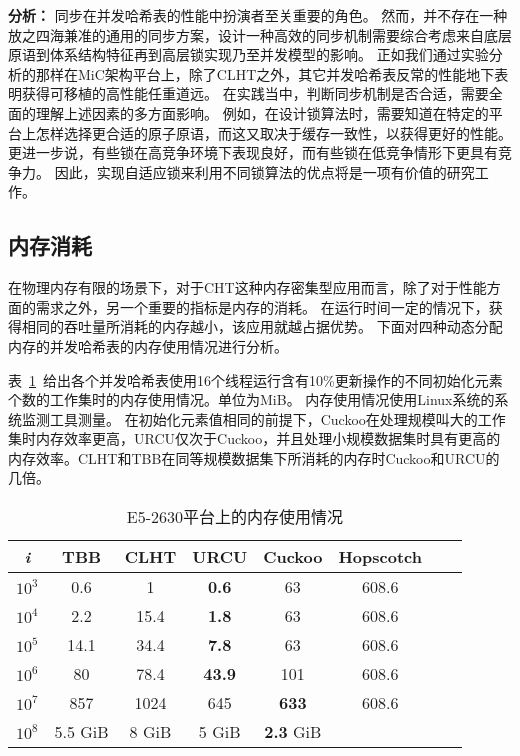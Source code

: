 \textbf{分析：} 同步在并发哈希表的性能中扮演者至关重要的角色。
然而，并不存在一种放之四海兼准的通用的同步方案，设计一种高效的同步机制需要综合考虑来自底层原语到体系结构特征再到高层锁实现乃至并发模型的影响。
正如我们通过实验分析的那样在MiC架构平台上，除了CLHT之外，其它并发哈希表反常的性能地下表明获得可移植的高性能任重道远。
在实践当中，判断同步机制是否合适，需要全面的理解上述因素的多方面影响。
例如，在设计锁算法时，需要知道在特定的平台上怎样选择更合适的原子原语，而这又取决于缓存一致性，以获得更好的性能。
更进一步说，有些锁在高竞争环境下表现良好，而有些锁在低竞争情形下更具有竞争力。
因此，实现自适应锁来利用不同锁算法的优点将是一项有价值的研究工作。

\subsection{内存消耗}
\label{sec:memory_comsume}
在物理内存有限的场景下，对于CHT这种内存密集型应用而言，除了对于性能方面的需求之外，另一个重要的指标是内存的消耗。
在运行时间一定的情况下，获得相同的吞吐量所消耗的内存越小，该应用就越占据优势。
下面对四种动态分配内存的并发哈希表的内存使用情况进行分析。

表~\ref{tab:memusage}~给出各个并发哈希表使用16个线程运行含有10\%更新操作的不同初始化元素个数的工作集时的内存使用情况。单位为MiB。
内存使用情况使用Linux系统的系统监测工具测量。
在初始化元素值相同的前提下，Cuckoo在处理规模叫大的工作集时内存效率更高，URCU仅次于Cuckoo，并且处理小规模数据集时具有更高的内存效率。CLHT和TBB在同等规模数据集下所消耗的内存时Cuckoo和URCU的几倍。


\begin{table}[htbp]
  \centering
  \caption{E5-2630平台上的内存使用情况}
  \label{tab:memusage}
  \begin{tabular}{cccccccc}
    \toprule
       \textit{i}   &   TBB   &    CLHT    &  URCU     &  Cuckoo &     Hopscotch \\
    \midrule
$10^3$     & 0.6  &   1   &  \textbf{0.6}   & 63 &   608.6    \\

$10^4$     & 2.2   &  15.4   &   \textbf{1.8}    & 63  &   608.6    \\

$10^5$     & 14.1 &    34.4   &   \textbf{7.8}   & 63  &  608.6     \\

$10^6$     & 80   &  78.4    &   \textbf{43.9}   & 101 &  608.6       \\

 $10^7$    &  857  &   1024   &   645    & \textbf{633} &  608.6     \\

 $10^8$    &  5.5 GiB  &   8 GiB   &   5 GiB    & \textbf{2.3} GiB &       \\
    \bottomrule
  \end{tabular}
\end{table}

